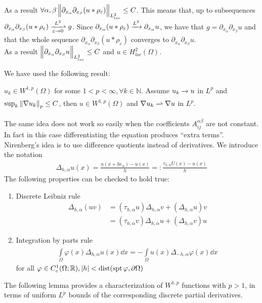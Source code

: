As a result \( \forall \alpha ,\beta \, \norm{\partial_{x_{\alpha }}\partial_{x_{\beta}}(u\ast \rho _{\varepsilon })}_{L_{loc}^{2}} \leq  C \). This means that, up to subsequences \( \partial_{x_{\alpha }}\partial_{x_{\beta}}(u\ast \rho _{\varepsilon }) \myxrightharpoonup[\varepsilon  \to 0]{L^{2}} g\). Since \( \partial_{x_{\alpha }}(u\ast \rho _{\varepsilon }) \myxrightarrow[]{L^{2}} \partial_{x_{\alpha }} u \), we have that \( g = \partial_{x_{\alpha }}\partial_{x_{\beta}}u\) and that the whole sequence \( \partial_{x_{\alpha }}\partial_{x_{\beta}}(u\ast \rho _{\varepsilon }) \) converges to \( \partial_{x_{\alpha }}\partial_{x_{\beta}}u \). \\
As a result \( \norm{\partial_{x_{\alpha }}\partial_{x_{\beta}}u}_{L_{loc}^{2}} \leq  C \) and \( u \in H_{loc}^{2} (\Omega )  \).\\
\par

We have used the following result:
\begin{lem}
	\( u_{k}\in W^{1,p}(\Omega )\) for some \( 1 < p < \infty, \forall k \in  \mathbb{N} \). Assume \( u_{k} \myxrightarrow[]{} u  \) in \( L^{p} \) and \( \sup_{k}\norm{\nabla u_{k}}_{p}\leq C \), then \( u\in W^{1,p}(\Omega ) \) and \( \nabla u_{k} \myxrightharpoonup[]{} \nabla u \) in \( L^{p} \).
\end{lem}
The same idea does not work so easily when the coefficients \( A_{ij}^{\alpha \beta } \) are not constant. In fact in this case differentiating the equation produces \enquote{extra terms}.\\
Nirenberg's idea is to use difference quotients instead of derivatives. We introduce the notation
\begin{gather}
	\Delta _{h, \alpha }u(x) = \frac{u(x+he_{\alpha})-u(x)}{h} =: \frac{\tau _{h, \alpha }U(x)-u(x) }{h }
\end{gather}
The following properties can be checked to hold true:
\begin{enumerate}[label= \( \bullet \)  ]
	\item Discrete Leibniz rule
	      \begin{align}
		      \Delta _{h, \alpha }(uv)
		       & = (\tau _{h, \alpha } u) \Delta _{h,\alpha }v + (\Delta _{h, \alpha} u) v  \\
		       & =    (\tau _{h, \alpha } v) \Delta _{h,\alpha }u + (\Delta _{h, \alpha} v) u
	      \end{align}

	\item Integration by parts rule
	      \begin{gather}
		      \int\limits_{\Omega}^{} \varphi (x) \Delta _{h, \alpha } u(x)   \dd{x} = -\int\limits_{\Omega}^{} u(x) \Delta _{-h, \alpha }\varphi (x)    \dd{x}
	      \end{gather}
	      for all \( \varphi \in  C_{c}^{1} (\Omega ; \mathbb{R}), \abs{h}< \operatorname{dist}(\operatorname{spt} \varphi, \partial \Omega )  \)
\end{enumerate}
The following lemma provides a characterization of \( W^{1,p} \) functions with \( p>1 \), in terms of uniform \( L^{p} \) bounds of the corresponding discrete partial derivatives.

